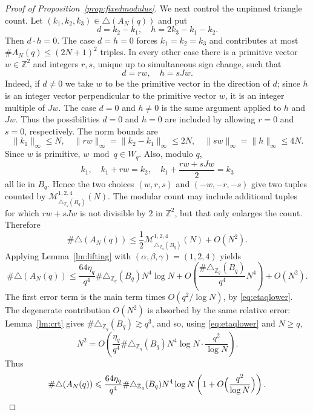 \documentclass[10pt,a4paper]{amsart}
\numberwithin{equation}{section}
\newcommand{\norm}[1]{\lVert #1\rVert_\infty}
\renewcommand{\le}{\leqslant}
\renewcommand{\ge}{\geqslant}
\begin{document}
\begin{proof}[Proof of Proposition~\ref{prop:fixedmodulus}]
We next control the unpinned triangle count. Let
$(k_1,k_2,k_3)\in\triangle(A_N(q))$ and put
\[ d=k_2-k_1, \quad h=2k_3-k_1-k_2. \]
Then $d\cdot h=0$. The case $d=h=0$ forces $k_1=k_2=k_3$ and contributes at most $\#A_N(q)\le (2N+1)^2$ triples. In every other case there is a primitive vector $w\in\mathbb{Z}^2$ and integers $r,s$, unique up to simultaneous sign change, such that
\[ d=rw, \quad h=sJw. \]
Indeed, if $d\ne0$ we take $w$ to be the primitive vector in the direction of $d$; since $h$ is an integer vector perpendicular to the primitive vector $w$, it is an integer multiple of $Jw$. The case $d=0$ and $h\ne0$ is the same argument applied to $h$ and $Jw$. Thus the possibilities $d=0$ and $h=0$ are included by allowing $r=0$ and $s=0$, respectively. The norm bounds are
\[ \norm{k_1}\le N, \quad \norm{rw}=\norm{k_2-k_1}\le2N, \quad \norm{sw}=\norm{h}\le4N. \]
Since $w$ is primitive, $w\bmod q\in W_q$. Also, modulo $q$,
\[ k_1, \quad k_1+rw=k_2, \quad k_1+\frac{rw+sJw}{2}=k_3 \]
all lie in $B_q$. Hence the two choices $(w,r,s)$ and $(-w,-r,-s)$ give two tuples counted by
$\mathcal{M}_{\triangle_{\mathbb{Z}_q}(B_q)}^{1,2,4}(N)$. The modular count may include additional tuples for which $rw+sJw$ is not divisible by $2$ in $\mathbb{Z}^2$, but that only enlarges the count. Therefore
\[ \#\triangle(A_N(q)) \le \frac12\mathcal{M}_{\triangle_{\mathbb{Z}_q}(B_q)}^{1,2,4}(N)+O(N^2). \]
Applying Lemma~\ref{lm:lifting} with $(\alpha,\beta,\gamma)=(1,2,4)$ yields
\[ \#\triangle(A_N(q)) \le \frac{64\eta_q}{q^4}\#\triangle_{\mathbb{Z}_q}(B_q)N^4\log N + O\left(\frac{\#\triangle_{\mathbb{Z}_q}(B_q)}{q^4}N^4\right) + O(N^2). \]
The first error term is the main term times $O(q^2/\log N)$, by \eqref{eq:etaqlower}. The degenerate contribution $O(N^2)$ is absorbed by the same relative error: Lemma~\ref{lm:crt} gives $\#\triangle_{\mathbb{Z}_q}(B_q)\gtrsim q^3$, and so, using \eqref{eq:etaqlower} and $N\ge q$,
\[ N^2=O\left(\frac{\eta_q}{q^4}\#\triangle_{\mathbb{Z}_q}(B_q)N^4\log N\cdot\frac{q^2}{\log N}\right). \]
Thus
\begin{equation}\label{eq:triasymp}
\#\triangle(A_N(q)) \le \frac{64\eta_q}{q^4}\#\triangle_{\mathbb{Z}_q}(B_q)N^4\log N \left(1+O\Bigl(\frac{q^2}{\log N}\Bigr)\right).
\end{equation}


\end{proof}
\end{document}
